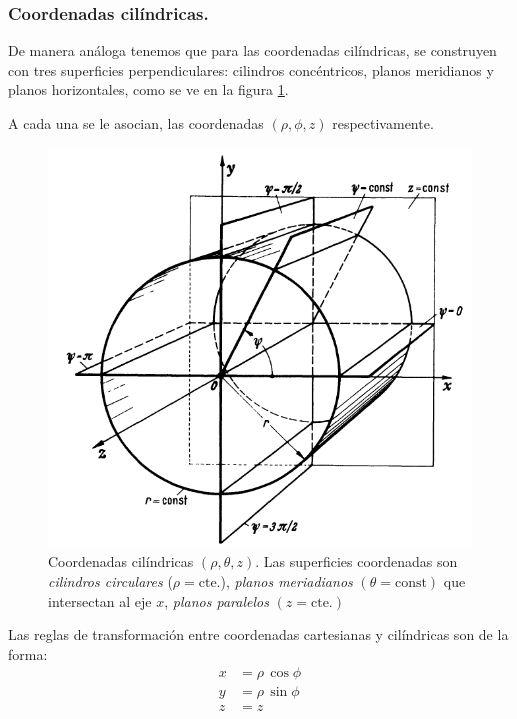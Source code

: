 \subsubsection*{Coordenadas cilíndricas.}
De manera análoga tenemos que para las coordenadas cilíndricas, se construyen con tres superficies perpendiculares: cilindros concéntricos, planos meridianos y planos horizontales, como se ve en la figura \ref{fig:figura_planos_cilindricos}.
\par
A cada una se le asocian, las coordenadas $(\rho, \phi, z)$ respectivamente.
\begin{figure}[H]
   \centering
   \includegraphics[scale=1.5]{Imagenes/Planos_Coordenadas_Cilindricas.png}
   \caption{Coordenadas cilíndricas $(\rho, \theta, z)$. Las superficies coordenadas son \emph{cilindros circulares} ($\rho = \mbox{cte.}$), \emph{planos meriadianos} $(\theta = \mbox{const})$ que intersectan al eje $x$, \emph{planos paralelos} $(z = \mbox{cte.})$}
   \label{fig:figura_planos_cilindricos}
\end{figure}
Las reglas de transformación entre coordenadas cartesianas y cilíndricas son de la forma:
\begin{align*}
x &= \rho \, \cos \phi \\ 
y &= \rho \, \sin \phi \\
z &= z
\end{align*}

